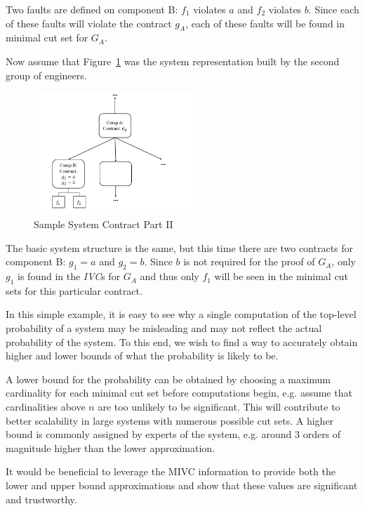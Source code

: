 Two faults are defined on component B: $f_1$ violates $a$ and $f_2$ violates $b$. Since each of these faults will violate the contract $g_A$, each of these faults will be found in minimal cut set for $G_A$.

Now assume that Figure~\ref{fig:probComp2} was the system representation built by the second group of engineers. 
\begin{figure}[h]
\begin{center}
\includegraphics[width=6cm]{images/probComp2.PNG}
\caption{Sample System Contract Part II} \label{fig:probComp2}
\end{center}
\end{figure} 
The basic system structure is the same, but this time there are two contracts for component B: $g_1 = a$ and $g_2 = b$. Since $b$ is not required for the proof of $G_A$, only $g_1$ is found in the \textit{IVC}s for $G_A$ and thus only $f_1$ will be seen in the minimal cut sets for this particular contract. 

In this simple example, it is easy to see why a single computation of the top-level probability of a system may be misleading and may not reflect the actual probability of the system. To this end, we wish to find a way to accurately obtain higher and lower bounds of what the probability is likely to be. 

A lower bound for the probability can be obtained by choosing a maximum cardinality for each minimal cut set before computations begin, e.g. assume that cardinalities above $n$ are too unlikely to be significant. This will contribute to better scalability in large systems with numerous possible cut sets. A higher bound is commonly assigned by experts of the system, e.g. around 3 orders of magnitude higher than the lower approximation. 

It would be beneficial to leverage the  MIVC information to provide both the lower and upper bound approximations and show that these values are significant and trustworthy. 


